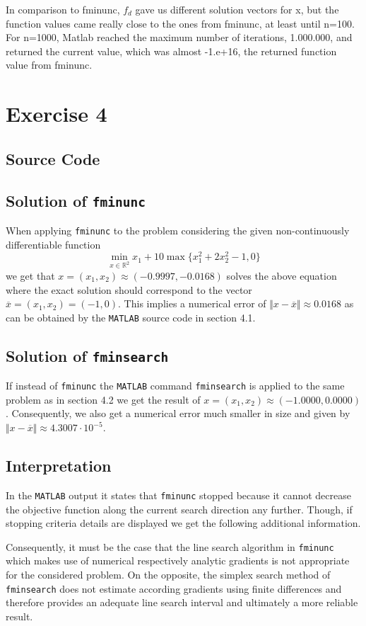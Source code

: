 \documentclass{article}
\begin{document}
    In comparison to fminunc, $f_d$ gave us different solution vectors for x, but the function values came really close to the ones from fminunc, at least until n=100. For n=1000, Matlab reached the maximum number of iterations, 1.000.000, and returned the current value, which was almost -1.e+16, the returned function value from fminunc.
	
	\section{Exercise 4}
	\subsection{Source Code}
	
	
	\subsection{Solution of \texttt{fminunc}}
	When applying \texttt{fminunc} to the problem considering the given non-continuously differentiable function 
	\begin{equation*}
		\min_{x\in\mathbb{R}^2}x_1+10\max\{x_1^2+2x_2^2-1,0\}
	\end{equation*}
	we get that $x=(x_1,x_2)\approx(-0.9997,-0.0168)$ solves the above equation where the exact solution should correspond to the vector $\overline{x}=(x_1,x_2)=(-1,0)$. This implies a numerical error of $\Vert x - \overline{x}\Vert \approx 0.0168$ as can be obtained by the \texttt{MATLAB} source code in section 4.1.
	\subsection{Solution of \texttt{fminsearch}}
	If instead of \texttt{fminunc} the \texttt{MATLAB} command \texttt{fminsearch} is applied to the same problem as in section 4.2 we get the result of $x=(x_1,x_2)\approx(-1.0000,0.0000)$. Consequently, we also get a numerical error much smaller in size and given by $\Vert x - \overline{x}\Vert \approx 4.3007\cdot 10^{-5}$.
	\subsection{Interpretation}
	In the \texttt{MATLAB} output it states that \texttt{fminunc} stopped because it cannot decrease the objective function along the current search direction any further. Though, if stopping criteria details are displayed we get the following additional information.
	
	Consequently, it must be the case that the line search algorithm in \texttt{fminunc} which makes use of numerical respectively analytic gradients is not appropriate for the considered problem. On the opposite, the simplex search method of \texttt{fminsearch} does not estimate according gradients using finite differences and therefore provides an adequate line search interval and ultimately a more reliable result. 
\end{document}
